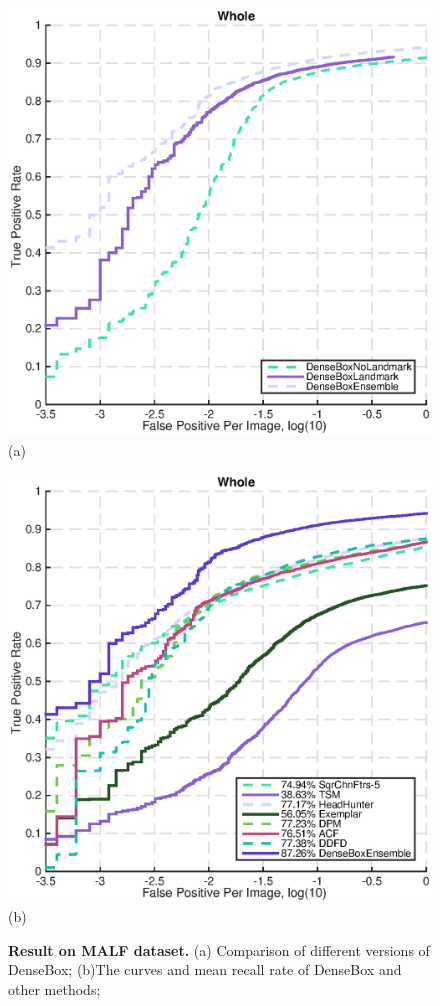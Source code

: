  
\begin{figure} 
  \begin{minipage}[t]{0.5\linewidth} %
    \centering 
    \includegraphics[scale = 0.5]{figures/MALF_1.eps}  (a)
  \end{minipage}%
  \begin{minipage}[t]{0.5\linewidth} 
    \centering 
    \includegraphics[scale = 0.5]{figures/MALF_2.eps}  (b)
  \end{minipage} 
 \caption{  \textbf{Result on MALF dataset. }  (a) Comparison of different versions of DenseBox; (b)The curves and mean recall rate of DenseBox and other methods;  }\label{fig:fig_malf}
\end{figure}

